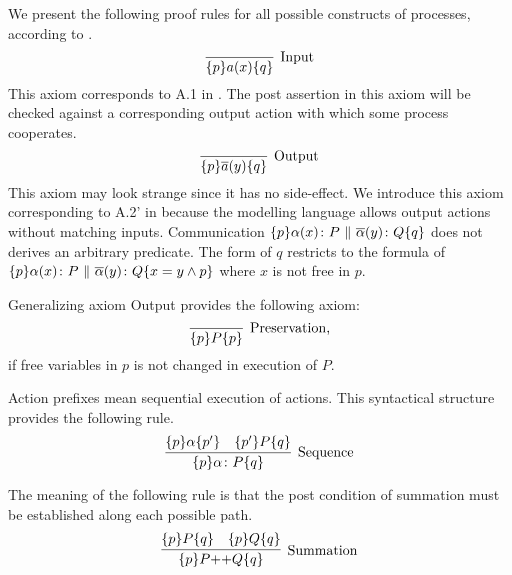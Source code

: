 \documentclass[12pt,a4paper,titlepage]{article}
\theoremstyle{break}
\begin{document}
We present the following proof rules for all possible constructs of processes, according to \cite{Apt:1980}.
  \begin{displaymath}
\infer[\mbox{Input}]{\{p\}a(x)\{q\}}
                    {}
  \end{displaymath}
This axiom corresponds to A.1 in \cite{Apt:1980}.
The post assertion in this axiom will be checked against a corresponding output action with which some process cooperates.
  \begin{displaymath}
\infer[\mbox{Output}]{\{p\}\bijection{a}(y)\{q\}}
                    {}
  \end{displaymath}
This axiom may look strange since it has no side-effect.
We introduce this axiom corresponding to A.2' in \cite{Apt:1980} because the modelling language allows output actions without matching inputs.
Communication \(\{p\}\alpha(x)\colon P\ \|\ \bijection{\alpha}(y)\colon Q\{q\}\) does not derives an arbitrary predicate.
The form of $q$ restricts to the formula of \(\{p\}\alpha(x)\colon P\ \|\ \bijection{\alpha}(y)\colon Q\{x=y\wedge p\}\) where $x$ is not free in $p$.

Generalizing axiom Output provides the following axiom:
  \begin{displaymath}
\infer[\mbox{Preservation,}]{\{p\}P\{p\}}
                    {}
  \end{displaymath}
if free variables in \(p\) is not changed in execution of \(P\).

Action prefixes mean sequential execution of actions.
This syntactical structure provides the following rule.
  \begin{displaymath}
\infer[\mbox{Sequence}]
      {\{p\}\alpha\colon P\{q\}}
      {\{p\}\alpha\{p'\}&\{p'\}P\{q\}}
  \end{displaymath}

The meaning of the following rule is that the post condition of summation must be established along each possible path.
  \begin{displaymath}
\infer[\mbox{Summation}]{\{p\}P\mbox{++}Q\{q\}}
                        {\{p\}P\{q\}&\{p\}Q\{q\}}
  \end{displaymath}
\end{document}
